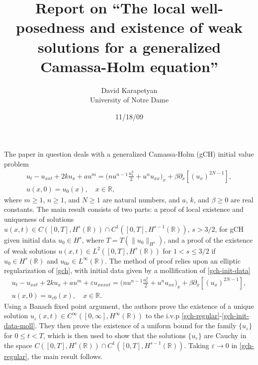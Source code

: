 \documentclass[12pt,reqno]{amsart}
\newcommand{\rr}{\mathbb{R}}
\newcommand{\p}{\partial}
\newcommand{\ee}{\varepsilon}
\theoremstyle{plain}  %
\begin{document}
\title{Report on ``The local well-posedness and existence of weak solutions  
for a generalized Camassa-Holm equation''}
\author{David Karapetyan \\ University of Notre Dame}
\address{Department of Mathematics  \\
         University  of Notre Dame\\
         Notre Dame, IN 46556 }
				  \date{11/18/09}
				  \maketitle
				  \parindent0in
				  \parskip0.1in
				  \setcounter{equation}{0}
				  The paper in question deals with a generalized 
				  Camassa-Holm (gCH) initial 
				  value problem%
%
\begin{gather}
	\label{gch}
		u_t - u_{xxt} + 2k u_x + au^m = \big( nu^{n-1} 
		\frac{u_x^2}{2} + u^n u_{xx} \big)_x + \beta \p_x \left 
		[(u_x)^{2N-1} \right ],
		\\
		\label{gch-init-data}
		u(x,0) = u_0(x), \quad x \in \rr,
\end{gather}
%
%
where $m \ge 1$, $n\ge1$, and $N \ge 1$ are natural numbers, and $a$, $k$, and 
$\beta \ge 0$ are real constants. The main result consists of two parts: a proof of local existence and uniqueness of solutions $u(x,t) \in C([0, T], H^s(\rr)) \cap 
C^1([0, T], H^{s-1}(\rr))$, $s > 3/2$, for gCH 
given initial data $u_0 \in H^s$, 
where $T = T(\|u_0\|_{H^s})$, and a proof of the existence of weak 
solutions $u(x,t) \in L^2([0,T], H^s(\rr))$ for $1 < s \le 3/2$ if $u_0 \in 
H^s(\rr)$ and $u_{0x} \in L^\infty(\rr)$. The method of proof relies upon an elliptic 
regularization of \eqref{gch}, with initial data given by a mollification 
of \eqref{gch-init-data}
%
%
	\begin{gather}
	\label{gch-regular}
	u_t - u_{xxt} + 2k u_x + au^m + \ee u_{xxxxt} = \big( nu^{n-1} 
		\frac{u_x^2}{2} + u^n u_{xx} \big)_x + \beta \p_x \left 
		[(u_x)^{2N-1} \right ],
		\\
		\label{gch-init-data-moll}
		u(x,0) = u_{\ee 0} (x), \quad x \in \rr.
\end{gather}
Using a Banach fixed point argument, the authors prove the existence of a 
unique solution $u_\ee(x,t) \in C^\infty([0, \infty], 
H^\infty(\rr))$ to the i.v.p 
\eqref{gch-regular}-\eqref{gch-init-data-moll}. They then prove the 
existence of a uniform bound for the family 
$\{u_\ee\}$ for $0 \le t < T$, which is then used to show that the solutions $\{u_\ee
\}$ are Cauchy in the space $C([0,T], H^s(\rr)) \cap C^1(\left[0,T \right], 
H^{s-1}(\rr))$. Taking $\ee \to 0$ in \eqref{gch-regular}, the main result 
follows.
\end{document}

